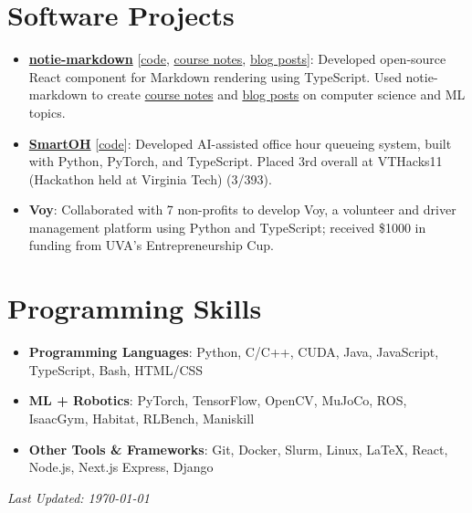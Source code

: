 \documentclass[letterpaper,11pt]{article}
\newcommand{\linkhref}[2]{\textcolor{linkblue}{\href{#1}{#2}}}
\begin{document}
\section{Software Projects}
\begin{itemize}[label={}, leftmargin=0pt]
    \item \textbf{\href{https://notie-markdown.vercel.app/}{notie-markdown}} [\linkhref{https://notie-markdown.vercel.app/}{code}, \linkhref{https://www.brandonyifanyang.com/notes}{course notes}, \linkhref{https://www.brandonyifanyang.com/blog}{blog posts}]: Developed open-source React component for Markdown rendering using TypeScript. Used notie-markdown to create \href{https://www.brandonyifanyang.com/notes}{course notes} and \href{https://www.brandonyifanyang.com/blog}{blog posts} on computer science and ML topics.
    \item \textbf{\href{https://github.com/ewei2406/SmartOH}{SmartOH}} [\linkhref{https://github.com/ewei2406/SmartOH}{code}]: Developed AI-assisted office hour queueing system, built with Python, PyTorch, and TypeScript. Placed 3rd overall at VTHacks11 (Hackathon held at Virginia Tech) (3/393).
    \item \textbf{Voy}: Collaborated with 7 non-profits to develop Voy, a volunteer and driver management platform using Python and TypeScript; received \$1000 in funding from UVA's Entrepreneurship Cup.
\end{itemize}

\section{Programming Skills}
\begin{itemize}[label={}, leftmargin=0pt]
    \item \textbf{Programming Languages}: Python, C/C++, CUDA, Java, JavaScript, TypeScript, Bash, HTML/CSS
    \item \textbf{ML + Robotics}: PyTorch, TensorFlow, OpenCV, MuJoCo, ROS, IsaacGym, Habitat, RLBench, Maniskill
    \item \textbf{Other Tools \& Frameworks}: Git, Docker, Slurm, Linux, \LaTeX, React, Node.js, Next.js Express, Django
\end{itemize}

\vfill
\noindent\textit{\small Last Updated: \today}
\end{document}
